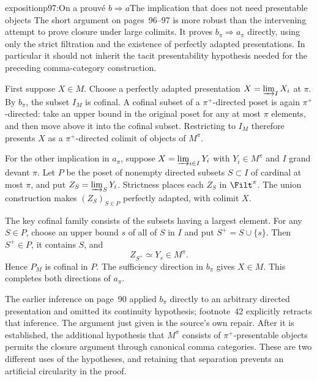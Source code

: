 \begin{dcomment}{exposition}{p97:On a prouvé $b\Longrightarrow a$}{The implication that does not need presentable objects}
The short argument on pages~96--97 is more robust than the intervening attempt to prove closure under large colimits. It proves $b_\pi\Rightarrow a_\pi$ directly, using only the strict filtration and the existence of perfectly adapted presentations. In particular it should not inherit the tacit presentability hypothesis needed for the preceding comma-category construction.

First suppose $X\in M$. Choose a perfectly adapted presentation $X=\varinjlim_I X_i$ at $\pi$. By $b_\pi$, the subset $I_M$ is cofinal. A cofinal subset of a $\pi^+$-directed poset is again $\pi^+$-directed: take an upper bound in the original poset for any at most $\pi$ elements, and then move above it into the cofinal subset. Restricting to $I_M$ therefore presents $X$ as a $\pi^+$-directed colimit of objects of $M^\pi$.

For the other implication in $a_\pi$, suppose $X=\varinjlim_{i\in I}Y_i$ with $Y_i\in M^\pi$ and $I$ grand devant $\pi$. Let $P$ be the poset of nonempty directed subsets $S\subset I$ of cardinal at most $\pi$, and put $Z_S=\varinjlim_S Y_i$. Strictness places each $Z_S$ in $\Filt^\pi$. The union construction makes $(Z_S)_{S\in P}$ perfectly adapted, with colimit $X$.

The key cofinal family consists of the subsets having a largest element. For any $S\in P$, choose an upper bound $s$ of all of $S$ in $I$ and put $S^+=S\cup\{s\}$. Then $S^+\in P$, it contains $S$, and
\[
 Z_{S^+}\simeq Y_s\in M^\pi.
\]
Hence $P_M$ is cofinal in $P$. The sufficiency direction in $b_\pi$ gives $X\in M$. This completes both directions of $a_\pi$.

The earlier inference on page~90 applied $b_\pi$ directly to an arbitrary directed presentation and omitted its continuity hypothesis; footnote~42 explicitly retracts that inference. The argument just given is the source's own repair. After it is established, the additional hypothesis that $M^\pi$ consists of $\pi^+$-presentable objects permits the closure argument through canonical comma categories. These are two different uses of the hypotheses, and retaining that separation prevents an artificial circularity in the proof.
\end{dcomment}


